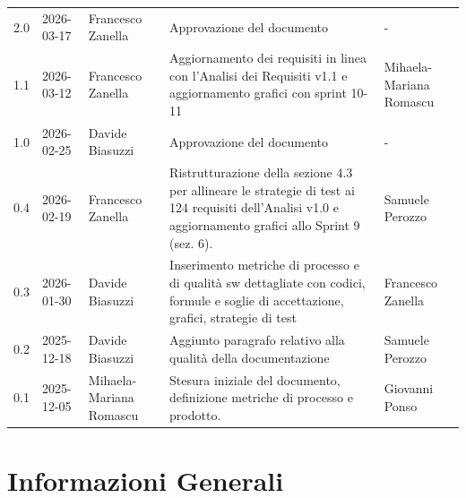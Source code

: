 \documentclass[a4paper,11pt,oneside]{scrartcl}
\begin{document}
{\begin{longtable}{@{}llp{}p{}p{}@{}}
        2.0               & 2026-03-17    & Francesco Zanella       & Approvazione del documento                                                                                                                               & -                       \\
        1.1               & 2026-03-12    & Francesco Zanella       & Aggiornamento dei requisiti in linea con l'Analisi dei Requisiti v1.1 e aggiornamento grafici con sprint 10-11                                           & Mihaela-Mariana Romascu \\
        1.0               & 2026-02-25    & Davide Biasuzzi         & Approvazione del documento                                                                                                                               & -                       \\
        0.4               & 2026-02-19    & Francesco Zanella       & Ristrutturazione della sezione 4.3 per allineare le strategie di test ai 124 requisiti dell'Analisi v1.0 e aggiornamento grafici allo Sprint 9 (sez. 6). & Samuele Perozzo         \\
        0.3               & 2026-01-30    & Davide Biasuzzi         & Inserimento metriche di processo e di qualità sw dettagliate con codici, formule e soglie di accettazione, grafici, strategie di test                    & Francesco Zanella       \\
        0.2               & 2025-12-18    & Davide Biasuzzi         & Aggiunto paragrafo relativo alla qualità della documentazione                                                                                            & Samuele Perozzo         \\
        0.1               & 2025-12-05    & Mihaela-Mariana Romascu & Stesura iniziale del documento, definizione metriche di processo e prodotto.                                                                             & Giovanni Ponso          \\
    \end{longtable}
}

\newpage
\tableofcontents
\newpage

\section*{Informazioni Generali}
\end{document}
